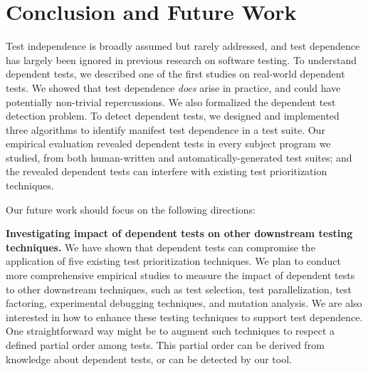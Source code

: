 
\vspace{-1mm}
\section{Conclusion and Future Work}
\label{sec:questions}


Test independence is broadly assumed but rarely addressed, and
test dependence has largely been ignored in previous
research on software testing. 
To understand dependent tests, we described one of the first studies on
real-world dependent tests. We showed that 
test dependence \textit{does} arise in practice, and could 
have potentially non-trivial repercussions. We also
formalized the dependent test detection
problem. To detect dependent tests, we designed
and implemented three algorithms to identify manifest test dependence
in a test suite. Our empirical evaluation revealed
dependent tests in every subject program
we studied, from both human-written and automatically-generated test
suites; and the revealed dependent tests can interfere with
existing test prioritization techniques.

Our future work should focus on the following directions:

\vspace{1mm}

\noindent \textbf{{Investigating impact of dependent tests
on other downstream testing techniques.}}
We have shown that dependent tests can compromise the application of
five existing test prioritization techniques.
We plan to conduct more comprehensive empirical studies to
measure the impact of dependent tests to other
downstream techniques, such as test selection,
test parallelization, test factoring, experimental
debugging techniques, and mutation analysis.
We are also interested in how to enhance these
testing techniques to support test dependence.
%
One straightforward way 
might be to augment such techniques to respect a
defined partial order among tests. This partial order
can be derived from knowledge about dependent tests,
or can be detected by our \ourtool tool.



\vspace{1mm}

